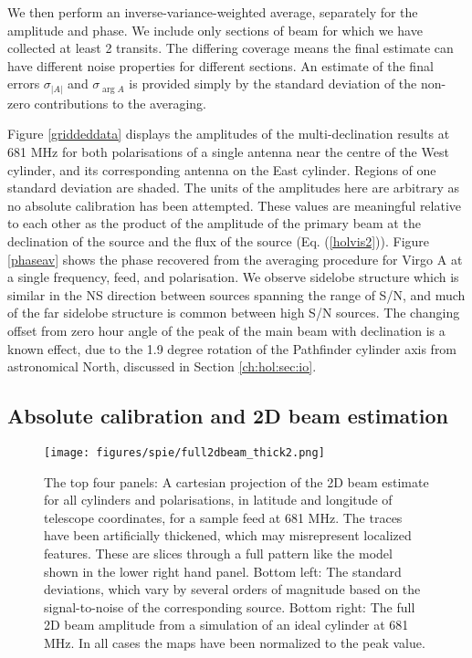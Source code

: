 We then perform an inverse-variance-weighted average, separately for the amplitude and phase. We include only sections of beam for which we have collected at least 2 transits. The differing coverage means the final estimate can have different noise properties for different sections. An estimate of the final errors $\sigma_{|A|}$ and $\sigma_{\arg{A}}$ is provided simply by the standard deviation of the non-zero contributions to the averaging.

Figure \ref{griddeddata} displays the amplitudes of the multi-declination results at 681 MHz for both polarisations of a single antenna near the centre of the West cylinder, and its corresponding antenna on the East cylinder. Regions of one standard deviation are shaded. The units of the amplitudes here are arbitrary as no absolute calibration has been attempted. These values are meaningful relative to each other as the product of the amplitude of the primary beam at the declination of the source and the flux of the source (Eq. (\ref{holvis2})). Figure \ref{phaseav} shows the phase recovered from the averaging procedure for Virgo A at a single frequency, feed, and polarisation. We observe sidelobe structure which is similar in the NS direction between sources spanning the range of S/N, and much of the far sidelobe structure is common between high S/N sources. The changing offset from zero hour angle of the peak of the main beam with declination is a known effect, due to the 1.9 degree rotation of the Pathfinder cylinder axis from astronomical North, discussed in Section \ref{ch:hol:sec:io}.

\subsection{Absolute calibration and 2D beam estimation}

\begin{figure}[h!] %
	\centering
	\texttt{[image: figures/spie/full2dbeam\_thick2.png]}%
	\caption{The top four panels: A cartesian projection of the 2D beam estimate for all cylinders and polarisations, in latitude and longitude of telescope coordinates, for a sample feed at 681 MHz. The traces have been artificially thickened, which may misrepresent localized features. These are slices through a full pattern like the model shown in the lower right hand panel. Bottom left: The standard deviations, which vary by several orders of magnitude based on the signal-to-noise of the corresponding source. Bottom right: The full 2D beam amplitude from a simulation of an ideal cylinder at 681 MHz. In all cases the maps have been normalized to the peak value.}
	\label{2dbeamslices}
\end{figure}

